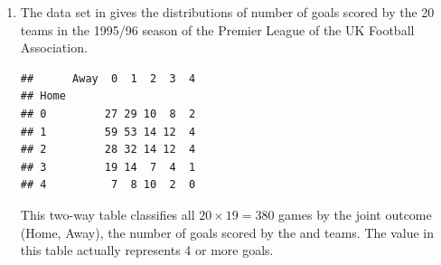 \documentclass[11pt]{book}
\renewenvironment{knitrout}{\small\renewcommand{\baselinestretch}{.85}}{} %
\begin{document}
\begin{enumerate}
\item The data set  in  gives the distributions of
number of goals scored by the 20 teams in the  1995/96 season of the
Premier League of the UK Football Association.  
\begin{knitrout}
\color{fgcolor}\begin{kframe}
\begin{alltt}
 \hlstd{=}\hlstd{)}
\end{alltt}
\begin{verbatim}
##      Away  0  1  2  3  4
## Home                    
## 0         27 29 10  8  2
## 1         59 53 14 12  4
## 2         28 32 14 12  4
## 3         19 14  7  4  1
## 4          7  8 10  2  0
\end{verbatim}
\end{kframe}
\end{knitrout}
This two-way table classifies all $20 \times 19 = 380$ games by the joint
outcome (Home, Away), the number of goals scored by the  and 
 teams.
The value  in this table actually represents 4 or more goals.



\end{enumerate}
\end{document}
